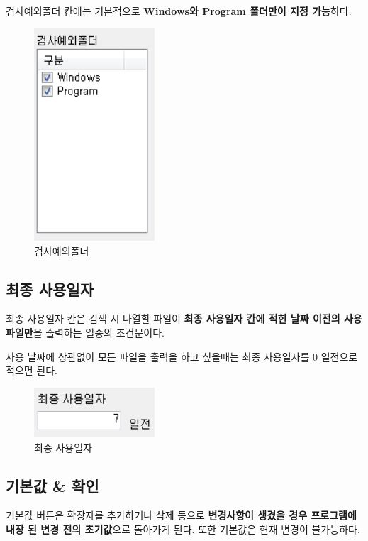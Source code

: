 \documentclass[a4paper, 13pt]{article} %
\begin{document}
		검사예외폴더 칸에는 기본적으로 \textbf{Windows와 Program 폴더만이 지정 가능}하다.
		
		\begin{figure}[h]
			\centering
			\includegraphics[width=0.4\textwidth]{Figures/except}
			\caption{검사예외폴더}
			\label{fig:except}
		\end{figure}
	
		\newpage
	
		\subsection{최종 사용일자}	
		최종 사용일자 칸은 검색 시 나열할 파일이 \textbf{최종 사용일자 칸에 적힌 날짜 이전의 사용 파일만}을 출력하는 일종의 조건문이다.
		
		사용 날짜에 상관없이 모든 파일을 출력을 하고 싶을때는 최종 사용일자를 0 일전으로 적으면 된다.
		
		\begin{figure}[h]
			\centering
			\includegraphics[width=0.4\textwidth]{Figures/date}
			\caption{최종 사용일자}
			\label{fig:date}
		\end{figure}
	
		\newpage
	
		\subsection{기본값 \& 확인}
		기본값 버튼은 확장자를 추가하거나 삭제 등으로 \textbf{변경사항이 생겼을 경우 프로그램에 내장 된 변경 전의 초기값}으로 돌아가게 된다. 또한 기본값은 현재 변경이 불가능하다.
		
\end{document}
